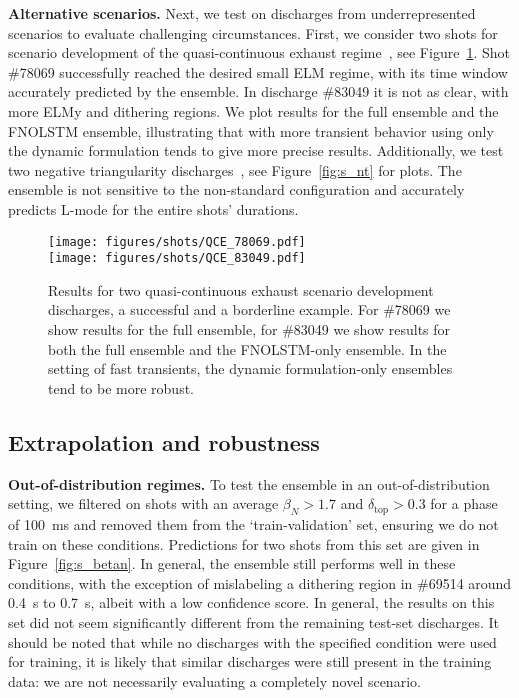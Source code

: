 \textbf{Alternative scenarios.} Next, we test on discharges from underrepresented scenarios to evaluate challenging circumstances. First, we consider two shots for scenario development of the quasi-continuous exhaust regime~\cite{labit2019}, see Figure~\ref{fig:s_qce}. Shot \#78069 successfully reached the desired small ELM regime, with its time window accurately predicted by the ensemble. In discharge \#83049 it is not as clear, with more ELMy and dithering regions. We plot results for the full ensemble and the FNOLSTM ensemble, illustrating that with more transient behavior using only the dynamic formulation tends to give more precise results. Additionally, we test two negative triangularity discharges~\cite{coda2022}, see Figure~\ref{fig:s_nt} for plots. The ensemble is not sensitive to the non-standard configuration and accurately predicts L-mode for the entire shots' durations. 

\begin{figure}[h]
\begin{center}\texttt{[image: figures/shots/QCE\_78069.pdf]}\\\texttt{[image: figures/shots/QCE\_83049.pdf]}\end{center}
    \caption{Results for two quasi-continuous exhaust scenario development discharges, a successful and a borderline example. For \#78069 we show results for the full ensemble, for \#83049 we show results for both the full ensemble and the FNOLSTM-only ensemble. In the setting of fast transients, the dynamic formulation-only ensembles tend to be more robust.}
    \label{fig:s_qce}%
\end{figure}

\subsection{Extrapolation and robustness}
\label{sec:extrapolation_robustness}
\textbf{Out-of-distribution regimes.} To test the ensemble in an out-of-distribution setting, we filtered on shots with an average $\beta_N > 1.7$ and $\delta_{\text{top}} > 0.3$ for a phase of \SI{100}{\milli\second} and removed them from the `train-validation' set, ensuring we do not train on these conditions. Predictions for two shots from this set are given in Figure~\ref{fig:s_betan}. In general, the ensemble still performs well in these conditions, with the exception of mislabeling a dithering region in \#69514 around \SI{0.4}{\second} to \SI{0.7}{\second}, albeit with a low confidence score. In general, the results on this set did not seem significantly different from the remaining test-set discharges. It should be noted that while no discharges with the specified condition were used for training, it is likely that similar discharges were still present in the training data: we are not necessarily evaluating a completely novel scenario.

